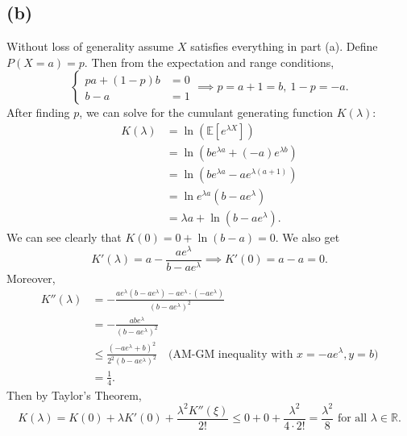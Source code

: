 \subsection*{(b)}
Without loss of generality assume $X$ satisfies everything in part (a). Define $P(X = a) = p$. Then 
from the expectation and range conditions, 
\[ \begin{cases}
	pa + (1 - p)b &= 0 \\
	b - a &= 1
\end{cases} \implies p = a + 1 = b, \ 1 - p = -a. \]
After finding $p$, we can solve for the cumulant generating function $K(\lambda)$: 
\begin{align*}
	K(\lambda) 
	&= \ln{(\mathbb{E}[e^{\lambda X}])} \\
	&= \ln{(be^{\lambda a} + (-a)e^{\lambda b})} \\
	&= \ln{(be^{\lambda a} - ae^{\lambda(a + 1)})} \\
	&= \ln{e^{\lambda a}(b - ae^\lambda)} \\
	&= \lambda a + \ln{(b - ae^\lambda)}.
\end{align*}
We can see clearly that $K(0) = 0 + \ln{(b - a)} = 0$. We also get 
\[ K'(\lambda) = a - \frac{ae^\lambda}{b - ae^\lambda} \implies K'(0) = a - a = 0. \]
Moreover, 
\begin{align*}
	K''(\lambda) 
	&= -\frac{ae^\lambda (b - ae^\lambda) - ae^\lambda \cdot (-ae^\lambda)}{(b - ae^\lambda)^2} \\
	&= -\frac{abe^\lambda}{(b - ae^\lambda)^2} \\
	&\leq \frac{(-ae^\lambda + b)^2}{2^2 (b - ae^\lambda)^2} \quad \text{(AM-GM inequality with } 
	x = -ae^\lambda, y = b) \\
	&= \frac{1}{4}.
\end{align*}
Then by Taylor's Theorem, 
\[ K(\lambda) 
= K(0) + \lambda K'(0) + \frac{\lambda^2 K''(\xi)}{2!} 
\leq 0 + 0 + \frac{\lambda^2}{4 \cdot 2!} = \frac{\lambda^2}{8} \text{ for all } \lambda \in \mathbb{R}. \]


\newpage
